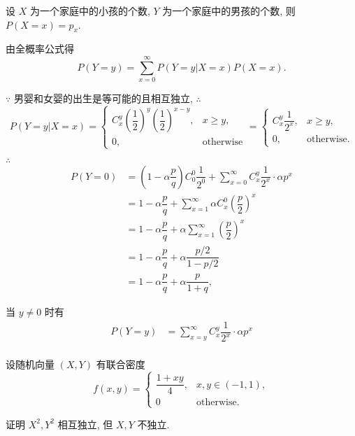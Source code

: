 \documentclass{ctexart}
\begin{document}
\begin{solution}
    设 $X$ 为一个家庭中的小孩的个数, $Y$ 为一个家庭中的男孩的个数, 则 $P(X=x)=p_x$.
    
    由全概率公式得
    \[P(Y=y)=\sum\limits_{x=0}^\infty P(Y=y|X=x)P(X=x).\]

    $\because$ 男婴和女婴的出生是等可能的且相互独立, $\therefore$
    \[P(Y=y|X=x)=\begin{cases}
        C_x^y\left(\dfrac{1}{2}\right)^y\left(\dfrac{1}{2}\right)^{x-y}, & x\geq y, \\
        0, & \text{otherwise}
    \end{cases}=\begin{cases}
        C_x^y\dfrac{1}{2^x}, & x\geq y, \\
        0, & \text{otherwise}.
    \end{cases}\]

    $\therefore$
    \begin{align*}
        P(Y=0) & =\left(1-\alpha\dfrac{p}{q}\right)C_0^0\dfrac{1}{2^0}+\sum\limits_{x=0}^\infty C_x^y\dfrac{1}{2^x}\cdot\alpha p^x \\
        & =1-\alpha\dfrac{p}{q}+\sum\limits_{x=1}^\infty\alpha C_x^0\left(\dfrac{p}{2}\right)^x \\
        & =1-\alpha\dfrac{p}{q}+\alpha\sum\limits_{x=1}^\infty\left(\dfrac{p}{2}\right)^x \\
        & =1-\alpha\dfrac{p}{q}+\alpha\dfrac{p/2}{1-p/2} \\
        & =1-\alpha\dfrac{p}{q}+\alpha\dfrac{p}{1+q},
    \end{align*}

    当 $y\neq0$ 时有
    \begin{align*}
        P(Y=y) & =\sum\limits_{x=y}^\infty C_x^y\dfrac{1}{2^x}\cdot\alpha p^x \\
    \end{align*}
\end{solution}
\begin{exercise}%
    设随机向量 $(X,Y)$ 有联合密度
    \[f(x,y)=\begin{cases}
        \dfrac{1+xy}{4}, & x,y\in(-1,1), \\[6pt]
        0 & \text{otherwise}.
    \end{cases}\]

    证明 $X^2,Y^2$ 相互独立, 但 $X,Y$ 不独立.
\end{exercise}
\end{document}
